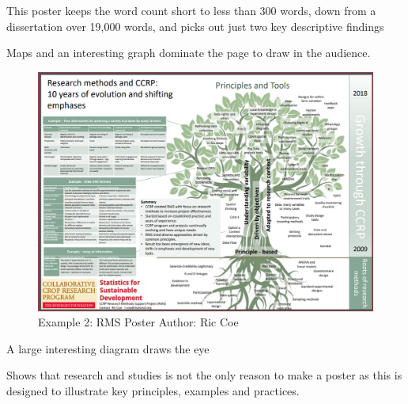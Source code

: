 \documentclass[
]{book}
\begin{document}
This poster keeps the word count short to less than 300 words, down from a dissertation over 19,000 words, and picks out just two key descriptive findings

Maps and an interesting graph dominate the page to draw in the audience.

\begin{figure}
\centering
\includegraphics{img/CCRP poster 1.png}
\caption{Example 2: RMS Poster Author: Ric Coe}
\end{figure}

A large interesting diagram draws the eye

Shows that research and studies is not the only reason to make a poster as this is designed to illustrate key principles, examples and practices.
\end{document}
